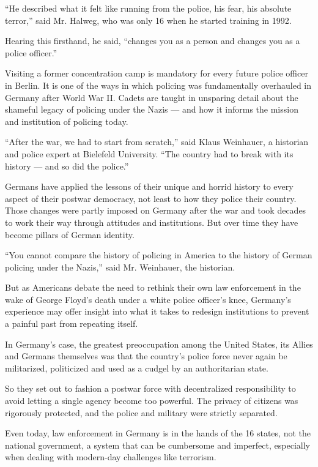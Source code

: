 ``He described what it felt like running from the police, his fear, his
absolute terror,'' said Mr. Halweg, who was only 16 when he started
training in 1992.

Hearing this firsthand, he said, ``changes you as a person and changes
you as a police officer.''

Visiting a former concentration camp is mandatory for every future
police officer in Berlin. It is one of the ways in which policing was
fundamentally overhauled in Germany after World War II. Cadets are
taught in unsparing detail about the shameful legacy of policing under
the Nazis --- and how it informs the mission and institution of policing
today.

``After the war, we had to start from scratch,'' said Klaus Weinhauer, a
historian and police expert at Bielefeld University. ``The country had
to break with its history --- and so did the police.''

Germans have applied the lessons of their unique and horrid history to
every aspect of their postwar democracy, not least to how they police
their country. Those changes were partly imposed on Germany after the
war and took decades to work their way through attitudes and
institutions. But over time they have become pillars of German identity.

``You cannot compare the history of policing in America to the history
of German policing under the Nazis,'' said Mr. Weinhauer, the historian.

But as Americans debate the need to rethink their own law enforcement in
the wake of George Floyd's death under a white police officer's knee,
Germany's experience may offer insight into what it takes to redesign
institutions to prevent a painful past from repeating itself.

In Germany's case, the greatest preoccupation among the United States,
its Allies and Germans themselves was that the country's police force
never again be militarized, politicized and used as a cudgel by an
authoritarian state.

So they set out to fashion a postwar force with decentralized
responsibility to avoid letting a single agency become too powerful. The
privacy of citizens was rigorously protected, and the police and
military were strictly separated.

Even today, law enforcement in Germany is in the hands of the 16 states,
not the national government, a system that can be cumbersome and
imperfect, especially when dealing with modern-day challenges like
terrorism.

